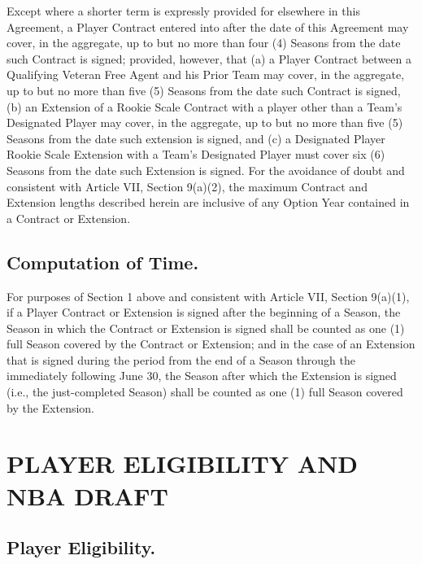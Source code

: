 \documentclass[
]{book}
\begin{document}
Except where a shorter term is expressly provided for elsewhere in this Agreement, a Player Contract entered into after the date of this Agreement may cover, in the aggregate, up to but no more than four (4) Seasons from the date such Contract is signed; provided, however, that (a) a Player Contract between a Qualifying Veteran Free Agent and his Prior Team may cover, in the aggregate, up to but no more than five (5) Seasons from the date such Contract is signed, (b) an Extension of a Rookie Scale Contract with a player other than a Team's Designated Player may cover, in the aggregate, up to but no more than five (5) Seasons from the date such extension is signed, and (c) a Designated Player Rookie Scale Extension with a Team's Designated Player must cover six (6) Seasons from the date such Extension is signed. For the avoidance of doubt and consistent with Article VII, Section 9(a)(2), the maximum Contract and Extension lengths described herein are inclusive of any Option Year contained in a Contract or Extension.

\hypertarget{computation-of-time.}{%
\section{Computation of Time.}\label{computation-of-time.}}

For purposes of Section 1 above and consistent with Article VII, Section 9(a)(1), if a Player Contract or Extension is signed after the beginning of a Season, the Season in which the Contract or Extension is signed shall be counted as one (1) full Season covered by the Contract or Extension; and in the case of an Extension that is signed during the period from the end of a Season through the immediately following June 30, the Season after which the Extension is signed (i.e., the just-completed Season) shall be counted as one (1) full Season covered by the Extension.

\hypertarget{player-eligibility-and-nba-draft}{%
\chapter{PLAYER ELIGIBILITY AND NBA DRAFT}\label{player-eligibility-and-nba-draft}}

\hypertarget{player-eligibility.}{%
\section{Player Eligibility.}\label{player-eligibility.}}
\end{document}
